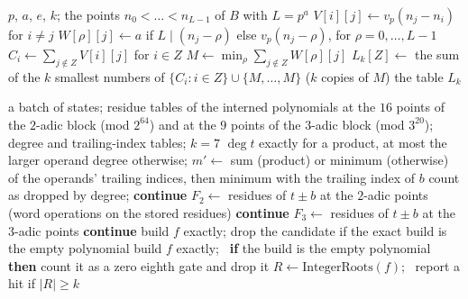 \documentclass[11pt]{article}
\theoremstyle{definition}
\theoremstyle{remark}
\begin{document}
\begin{algorithm}[t]
\caption{Construction of the bound table $L_k$ for one prime $p$, block $B$ of $p^a$ points and exponent $e$.}
\label{alg:table}
\begin{algorithmic}[1]
\Require $p$, $a$, $e$, $k$; the points $n_0 < \dots < n_{L-1}$ of $B$ with $L = p^a$
\State $V[i][j] \gets v_p(n_j - n_i)$ for $i \ne j$ 
\State $W[\rho][j] \gets a$ if $L \mid (n_j - \rho)$ else $v_p(n_j - \rho)$, for $\rho = 0, \dots, L-1$
  \State $C_i \gets \sum_{j \notin Z} V[i][j]$ for $i \in Z$
  \State $M \gets \min_\rho \sum_{j \notin Z} W[\rho][j]$
  \State $L_k[Z] \gets$ the sum of the $k$ smallest numbers of $\{C_i : i \in Z\} \cup \{M, \dots, M\}$ ($k$ copies of $M$)
\EndFor
\State \Return the table $L_k$
\end{algorithmic}
\end{algorithm}

\begin{algorithm}[t]
\caption{The block filter for every candidate $f = t \pm b$ of one batch of frontier states.}
\label{alg:filter}
\begin{algorithmic}[1]
\Require a batch of states; residue tables of the interned polynomials at the $16$ points of the $2$-adic block (mod $2^{64}$) and at the $9$ points of the $3$-adic block (mod $3^{20}$); degree and trailing-index tables; $k = 7$
  \State $\deg t$ exactly for a product, at most the larger operand degree otherwise; $m' \gets$ sum (product) or minimum (otherwise) of the operands' trailing indices, then minimum with the trailing index of $b$
   count as dropped by degree; \textbf{continue} \EndIf
    \State $F_2 \gets$ residues of $t \pm b$ at the $2$-adic points (word operations on the stored residues)
     \textbf{continue} \EndIf
    \State $F_3 \gets$ residues of $t \pm b$ at the $3$-adic points
     \textbf{continue} \EndIf
     
      \State build $f$ exactly; drop the candidate if the exact build is the empty polynomial
    \Else
      \State build $f$ exactly; \ \textbf{if} the build is the empty polynomial \textbf{then} count it as a zero eighth gate and drop it
    \EndIf
    \State $R \gets \mathrm{IntegerRoots}(f)$; \ report a hit if $|R| \ge k$
  \EndFor
\EndFor
\end{algorithmic}
\end{algorithm}
\end{document}
